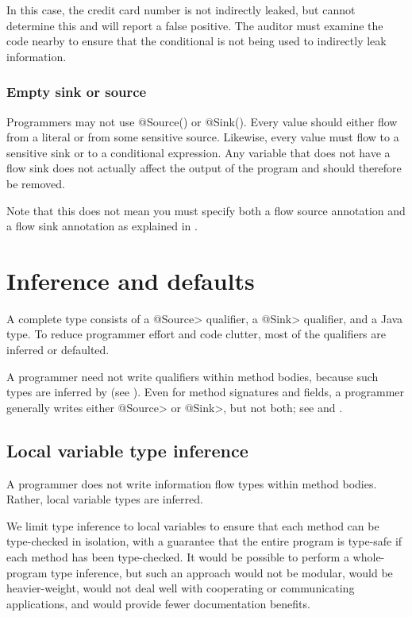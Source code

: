 In this case, the credit card number is not indirectly leaked, but \theFlowChecker  
cannot determine this and will report a false positive.
The auditor must examine the code nearby
to ensure that the conditional is not being used to indirectly leak information.


\subsubsection{Empty sink or source\label{sec:emptyflow}}

Programmers may not use @Source(\ttcbs) or @Sink(\ttcbs).
Every value should either flow from a literal or from some sensitive
source.  Likewise, every value must flow to a sensitive sink or to a
conditional expression.  Any variable that does not have
 a flow sink does not actually affect the output of the program and
should therefore be removed.
  
Note that this does not mean you must specify both a flow source
annotation and a flow sink annotation as explained in
. 

  \section{Inference and defaults}
 \label{sec:system:defaults}
 
 A complete type consists of a \<@Source> qualifier, a \<@Sink> qualifier,
 and a Java type.  To reduce programmer effort and code clutter, most of the
 qualifiers are inferred or defaulted.  
 
 A programmer need not write qualifiers within method bodies,
 because such types are inferred by \theFlowChecker (see ).
 Even for method signatures and
 fields, a programmer generally writes either \<@Source> or
 \<@Sink>, but not both; see  and 
.

\subsection{Local variable type inference}
\label{sec:type-inference}

A programmer does not write information flow types within method bodies.  Rather, local
variable types are inferred.

We limit type inference to local variables to ensure that
each method can be type-checked in isolation,
with a guarantee that the entire program is type-safe if each method has
been type-checked.  It would be possible to perform a whole-program type
inference, but such an approach would not be modular, would be
heavier-weight, would not deal well with cooperating or communicating
applications, and would provide fewer documentation benefits.  


